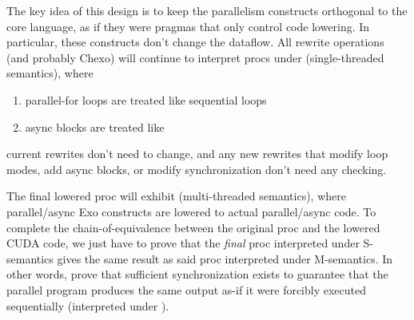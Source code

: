 The key idea of this design is to keep the parallelism constructs orthogonal to the core language, as if they were pragmas that only control code lowering.
In particular, these constructs don't change the dataflow.
All rewrite operations (and probably Chexo) will continue to interpret procs under  (single-threaded semantics), where
\begin{enumerate}
  \item parallel-for loops are treated like sequential loops
  \item async blocks are treated like 
\end{enumerate}

\filbreak
{} current rewrites don't need to change, and any new rewrites that modify loop modes, add async blocks, or modify synchronization don't need any checking.

\filbreak
The final lowered proc will exhibit  (multi-threaded semantics), where parallel/async Exo constructs are lowered to actual parallel/async code.
To complete the chain-of-equivalence between the original proc and the lowered CUDA code, we just have to prove that the \textit{final} proc interpreted under S-semantics gives the same result as said proc interpreted under M-semantics.
In other words, prove that sufficient synchronization exists to guarantee that the parallel program produces the same output as-if it were forcibly executed sequentially (interpreted under ).

